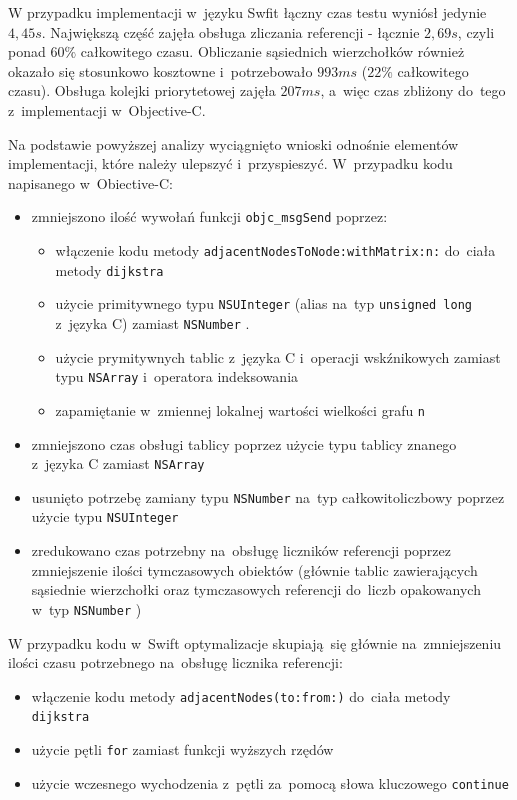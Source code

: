 \documentclass[mgr, shortabstract]{iithesis}
\newcommand{\swiftinline}[1]{
    \texttt{#1}
}
\newcommand{\objcinline}[1]{
    \texttt{#1}
}
\begin{document}
W przypadku implementacji w~języku Swfit łączny czas testu wyniósł jedynie $4,45s$. Największą część zajęła obsługa zliczania referencji - łącznie $2,69s$, czyli ponad $60\%$ całkowitego czasu. Obliczanie sąsiednich wierzchołków również okazało się stosunkowo kosztowne i~potrzebowało $993ms$ ($22\%$ całkowitego czasu). Obsługa kolejki priorytetowej zajęła $207ms$, a~więc czas zbliżony do~tego z~implementacji w~Objective-C.

Na podstawie powyższej analizy wyciągnięto wnioski odnośnie elementów implementacji, które należy ulepszyć i~przyspieszyć. W~przypadku kodu napisanego w~Obiective-C:

\begin{itemize}
    \item zmniejszono ilość wywołań funkcji \objcinline{objc_msgSend} poprzez:
    \begin{itemize}
        \item włączenie kodu metody \objcinline{adjacentNodesToNode:withMatrix:n:} do~ciała metody \objcinline{dijkstra}
        \item użycie primitywnego typu \objcinline{NSUInteger} (alias na~typ \objcinline{unsigned long} z~języka C) zamiast \objcinline{NSNumber}.
        \item użycie prymitywnych tablic z~języka C i~operacji wskźnikowych zamiast typu \objcinline{NSArray} i~operatora indeksowania
        \item zapamiętanie w~zmiennej lokalnej wartości wielkości grafu \objcinline{n}
    \end{itemize}
    \item zmniejszono czas obsługi tablicy poprzez użycie typu tablicy znanego z~języka C zamiast \objcinline{NSArray}
    \item usunięto potrzebę zamiany typu \objcinline{NSNumber} na~typ całkowitoliczbowy poprzez użycie typu \objcinline{NSUInteger}
    \item zredukowano czas potrzebny na~obsługę liczników referencji poprzez zmniejszenie ilości tymczasowych obiektów (głównie tablic zawierających sąsiednie wierzchołki oraz tymczasowych referencji do~liczb opakowanych w~typ \objcinline{NSNumber})
\end{itemize}

W przypadku kodu w~Swift optymalizacje skupiają się głównie na~zmniejszeniu ilości czasu potrzebnego na~obsługę licznika referencji:

\begin{itemize}
    \item włączenie kodu metody \swiftinline{adjacentNodes(to:from:)} do~ciała metody \swiftinline{dijkstra}
    \item użycie pętli \swiftinline{for} zamiast funkcji wyższych rzędów
    \item użycie wczesnego wychodzenia z~pętli za~pomocą słowa kluczowego \swiftinline{continue}
\end{itemize}
\end{document}
